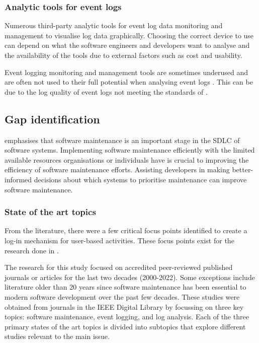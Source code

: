\subsubsection{Analytic tools for event logs}
Numerous third-party analytic tools for event log data monitoring and management to visualise log data graphically. Choosing the correct device to use can depend on what the software engineers and developers want to analyse and the availability of the tools due to external factors such as cost and usability. \par Event logging monitoring and management tools are sometimes underused and are often not used to their full potential when analysing event logs \cite{Fedaghi2010}. This can be due to the log quality of event logs not meeting the standards of . 

\newcommand{\studyGap}{Implementing software maintenance efficiently with the limited available resources organisations or individuals have is crucial to improving the efficiency of software maintenance efforts. Assisting developers in making better-informed decisions about which systems to prioritise maintenance can improve software maintenance.}

\subsection{Gap identification}\label{sec:ch1_gapIdentification}
 emphasises that software maintenance is an important stage in the SDLC of software systems. \studyGap

\subsubsection{State of the art topics}
From the literature, there were a few critical focus points identified to create a log-in mechanism for user-based activities. These focus points exist for the research done in .\par The research for this study focused on accredited peer-reviewed published journals or articles for the last two decades (2000-2022). Some exceptions include literature older than 20 years since software maintenance has been essential to modern software development over the past few decades. These studies were obtained from journals in the IEEE Digital Library by focussing on three key topics: software maintenance, event logging, and log analysis. Each of the three primary states of the art topics is divided into subtopics that explore different studies relevant to the main issue.

